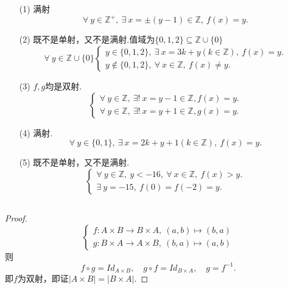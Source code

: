 \documentclass[UTF8]{ctexart}
\begin{document}
\subsection{}   %
\begin{enumerate}
    \item [(1)]满射
    \[
        \forall\ y\in \mathbb{Z}^{+},\ 
        \exists\ x=\pm(y-1)\in \mathbb{Z},\ 
        f(x)=y.    
    \]
    \item [(2)]既不是单射，又不是满射.值域为$\{0,1,2\}\subseteq \mathbb{Z}\cup\{0\}$
    \[
        \forall\ y\in \mathbb{Z}\cup\{0\}
        \begin{cases}
            y\in \{0,1,2\},\ \exists\ x=3k+y(k\in \mathbb{Z}),\ f(x)=y.\\
            y\notin \{0,1,2\},\ \forall\ x\in \mathbb{Z},\ f(x)\neq y.
        \end{cases}
    \]
    \item [(3)]$f,g$均是双射.
    \[
        \begin{cases}
            \forall\ y\in \mathbb{Z},\ \exists !\ x=y-1\in \mathbb{Z},f(x)=y.\\
            \forall\ y\in \mathbb{Z},\ \exists !\ x=y+1\in \mathbb{Z},g(x)=y. 
        \end{cases}    
    \]
    \item [(4)]满射.
    \[
        \forall\ y\in \{0,1\},\ 
        \exists\ x=2k+y+1(k\in\mathbb{Z}),\ f(x)=y.    
    \]
    \item [(5)]既不是单射，又不是满射.
    \[
        \begin{cases}
            \forall\ y\in \mathbb{Z},\ y<-16,\ \forall\ x\in\mathbb{Z},\ f(x)>y.\\
            \exists\ y=-15,\ f(0)=f(-2)=y.
        \end{cases}
    \]
\end{enumerate}

\subsection{}   %
\begin{proof}
    \[
        \begin{cases}
            f:A\times B \rightarrow B\times A,\ (a,b) \mapsto (b,a) \\
            g:B\times A \rightarrow A\times B,\ (b,a) \mapsto (a,b) 
        \end{cases}    
    \]
    则
    \[
        f\circ g = {Id}_{A\times B},\quad
        g\circ f = {Id}_{B\times A},\quad
        g=f^{-1}. 
    \]
    即$f$为双射，即证$|A\times B|=|B\times A|$.
\end{proof}
\end{document}
